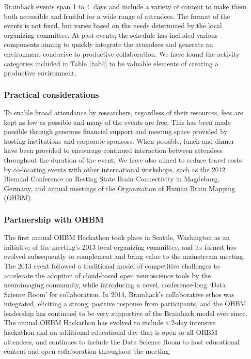 \documentclass[11pt]{bmc_article_s50}
\begin{document}
Brainhack events span 1 to 4~days and include a variety of content to make them both accessible and fruitful for a wide range of attendees. The format of the events is not fixed, but varies based on the needs determined by the local organizing committee. At past events, the schedule has included various components aiming to quickly integrate the attendees and generate an environment conducive to productive collaboration. We have found the activity categories included in Table~\ref{tab4} to be valuable elements of creating a productive environment. 

\subsubsection*{Practical considerations}

To enable broad attendance by researchers, regardless of their resources, fees are kept as low as possible and many of the events are free. This has been made possible through generous financial support and meeting space provided by hosting institutions and corporate sponsors. When possible, lunch and dinner have been provided to encourage continued interaction between attendees throughout the duration of the event. We have also aimed to reduce travel costs by co-locating events with other international workshops, such as the 2012 Biennial Conference on Resting State Brain Connectivity in Magdeburg, Germany, and annual meetings of the Organization of Human Brain Mapping (OHBM). 

\subsubsection*{Partnership with OHBM}

The first annual OHBM Hackathon took place in Seattle, Washington as an initiative of the meeting's 2013 local organizing committee, and its format has evolved subsequently to complement and bring value to the mainstream meeting. The 2013 event followed a traditional model of competitive challenges to accelerate the adoption of cloud-based open neuroscience tools by the neuroimaging community, while introducing a novel, conference-long `Data Science Room' for collaboration. In 2014, Brainhack's collaborative ethos was integrated, eliciting a strong, positive response from participants, and the OHBM leadership has continued to be very supportive of the Brainhack model ever since. The annual OHBM Hackathon has evolved to include a 2-day intensive hackathon and an additional educational day that is open to all OHBM attendees, and continues to include the Data Science Room to host educational content and open collaboration throughout the meeting. 
\end{document}
